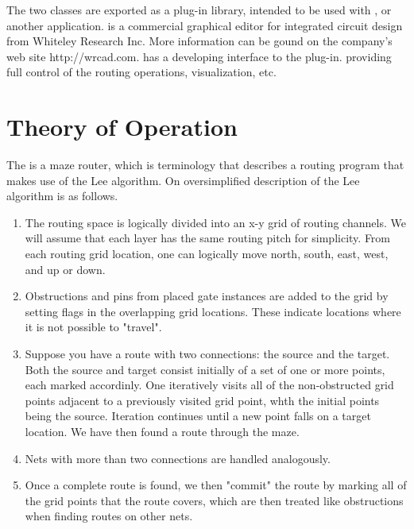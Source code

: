 The two classes are exported as a plug-in library, intended to be used
with {\Xic}, or another application.  {\Xic} is a commercial graphical
editor for integrated circuit design from Whiteley Research Inc.  More
information can be gound on the company's web site {\vt
http://wrcad.com}.  {\Xic} has a developing interface to the
{\MRouter} plug-in.  providing full control of the routing operations,
visualization, etc.

\section{Theory of Operation}

The {\MRouter} is a maze router, which is terminology that describes
a routing program that makes use of the Lee algorithm.  On
oversimplified description of the Lee algorithm is as follows.

\begin{enumerate}
\item{The routing space is logically divided into an x-y grid of
routing channels.  We will assume that each layer has the same
routing pitch for simplicity.  From each routing grid location, one
can logically move north, south, east, west, and up or down.}

\item{Obstructions and pins from placed gate instances are added to
the grid by setting flags in the overlapping grid locations.  These
indicate locations where it is not possible to "travel".}

\item{Suppose you have a route with two connections:  the source and
the target.  Both the source and target consist initially of a set of
one or more points, each marked accordinly.  One iteratively visits
all of the non-obstructed grid points adjacent to a previously
visited grid point, whth the initial points being the source. 
Iteration continues until a new point falls on a target location.  We
have then found a route through the maze.}

\item{Nets with more than two connections are handled analogously.}

\item{Once a complete route is found, we then "commit" the route by
marking all of the grid points that the route covers, which are then
treated like obstructions when finding routes on other nets.}
\end{enumerate}

